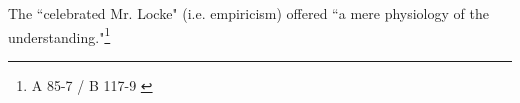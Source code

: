 The ``celebrated Mr. Locke" (i.e. empiricism) offered ``a mere physiology of the understanding."\footnote{A 85-7 / B 117-9 \cite{smith2011immanuel}}